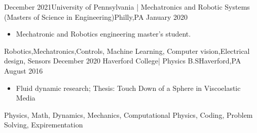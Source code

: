%
%
%


\begin{experiences}
 \experience
    {December 2021}{University of Pennsylvania | Mechatronics and Robotic Systems }{(Masters of Science in Engineering)}{Philly,PA}
    {January 2020} {
                      \begin{itemize}
                        \item Mechatronic and Robotics engineering master's student.
                      \end{itemize}
                    }
                     {Robotics,Mechatronics,Controls, Machine Learning, Computer vision,Electrical design, Sensors}
  \emptySeparator
  \experience
    {December 2020}   {Haverford College| Physics }{B.S}{Haverford,PA}
    {August 2016} {
                      \begin{itemize}
    			    \item Fluid dynamic research; Thesis: Touch Down of a Sphere in Viscoelastic Media     	
                                                 
                      \end{itemize}
                    }
                     {Physics, Math, Dynamics, Mechanics, Computational Physics, Coding, Problem Solving, Expirementation}
 
\end{experiences}

